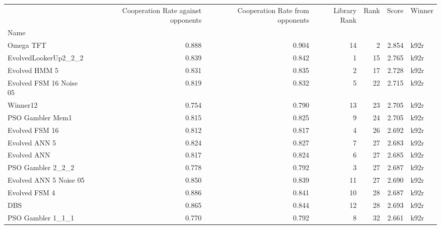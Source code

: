 \begin{tabular}{lrrrrrl}
\toprule
{} &  Cooperation Rate against opponents &  Cooperation Rate from opponents &  Library Rank &  Rank &  Score & Winner \\
Name                    &                                     &                                  &               &       &        &        \\
\midrule
Omega TFT               &                               0.888 &                            0.904 &            14 &     2 &  2.854 &   k92r \\
EvolvedLookerUp2\_2\_2    &                               0.839 &                            0.842 &             1 &    15 &  2.765 &   k92r \\
Evolved HMM 5           &                               0.831 &                            0.835 &             2 &    17 &  2.728 &   k92r \\
Evolved FSM 16 Noise 05 &                               0.819 &                            0.832 &             5 &    22 &  2.715 &   k92r \\
Winner12                &                               0.754 &                            0.790 &            13 &    23 &  2.705 &   k92r \\
PSO Gambler Mem1        &                               0.815 &                            0.825 &             9 &    24 &  2.705 &   k92r \\
Evolved FSM 16          &                               0.812 &                            0.817 &             4 &    26 &  2.692 &   k92r \\
Evolved ANN 5           &                               0.824 &                            0.827 &             7 &    27 &  2.683 &   k92r \\
Evolved ANN             &                               0.817 &                            0.824 &             6 &    27 &  2.685 &   k92r \\
PSO Gambler 2\_2\_2       &                               0.778 &                            0.792 &             3 &    27 &  2.687 &   k92r \\
Evolved ANN 5 Noise 05  &                               0.850 &                            0.839 &            11 &    27 &  2.690 &   k92r \\
Evolved FSM 4           &                               0.886 &                            0.841 &            10 &    28 &  2.687 &   k92r \\
DBS                     &                               0.865 &                            0.844 &            12 &    28 &  2.693 &   k92r \\
PSO Gambler 1\_1\_1       &                               0.770 &                            0.792 &             8 &    32 &  2.661 &   k92r \\
\bottomrule
\end{tabular}
